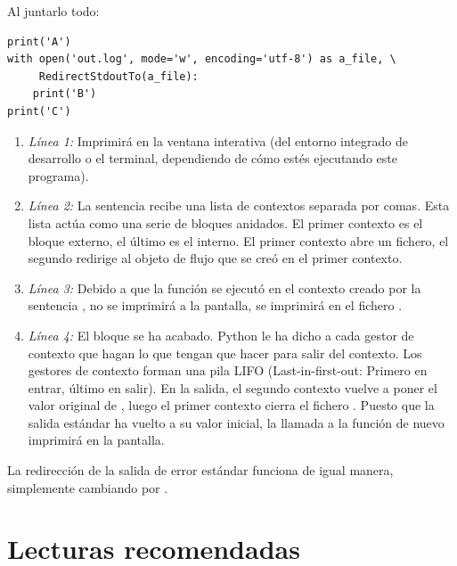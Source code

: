 Al juntarlo todo:

\noindent\begin{minipage}{\textwidth}
\begin{lstlisting}[mathescape=True]
print('A')
with open('out.log', mode='w', encoding='utf-8') as a_file, \
     RedirectStdoutTo(a_file):
    print('B')             
print('C')
\end{lstlisting}
\end{minipage}

\begin{enumerate}

\item \emph{Línea 1:} Imprimirá en la ventana interativa (del entorno integrado de desarrollo o el terminal, dependiendo de cómo estés ejecutando este programa).

\item \emph{Línea 2:} La sentencia  recibe una lista de contextos separada por comas. Esta lista actúa como una serie de bloques  anidados. El primer contexto es el bloque externo, el último es el interno. El primer contexto abre un fichero, el segundo redirige  al objeto de flujo que se creó en el primer contexto.

\item \emph{Línea 3:} Debido a que la función  se ejecutó en el contexto creado por la sentencia , no se imprimirá a la pantalla, se imprimirá en el fichero .

\item \emph{Línea 4:} El bloque  se ha acabado. Python le ha dicho a cada gestor de contexto que hagan lo que tengan que hacer para salir del contexto. Los gestores de contexto forman una pila LIFO (Last-in-first-out: Primero en entrar, último en salir). En la salida, el segundo contexto vuelve a poner el valor original de , luego el primer contexto cierra el fichero . Puesto que la salida estándar ha vuelto a su valor inicial, la llamada a la función  de nuevo imprimirá en la pantalla.

\end{enumerate}

La redirección de la salida de error estándar funciona de igual manera, simplemente cambiando  por .

\section{Lecturas recomendadas}

